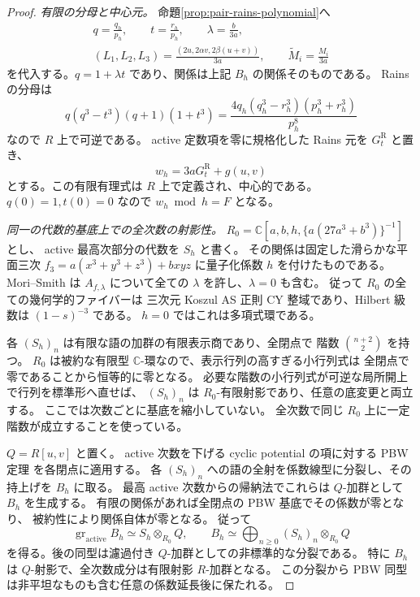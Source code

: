 \begin{proof}
\emph{有限の分母と中心元。}
命題\ref{prop:pair-rains-polynomial}へ
\[
 \begin{gathered}
 q=\frac{q_h}{p_h},\qquad t=\frac{r_h}{p_h},\qquad
 \lambda=\frac b{3a},\\
 (L_1,L_2,L_3)=\frac{(2u,2\alpha v,2\beta(u+v))}{3a},
 \qquad\widetilde M_i=\frac{M_i}{3a}
 \end{gathered}
\]
を代入する。$q=1+\lambda t$ であり、関係は上記 $B_h$ の関係そのものである。
Rains の分母は
\[
 q(q^3-t^3)(q+1)(1+t^3)
 =\frac{4q_h(q_h^3-r_h^3)(p_h^3+r_h^3)}{p_h^8}
\]
なので $R$ 上で可逆である。
active 定数項を零に規格化した Rains 元を $G_t^{\mathrm R}$ と置き、
\[
 w_h=3aG_t^{\mathrm R}+g(u,v)
\]
とする。この有限有理式は $R$ 上で定義され、中心的である。
$q(0)=1,t(0)=0$ なので $w_h\bmod h=F$ となる。

\emph{同一の代数的基底上での全次数の射影性。}
$R_0=\mathbb C[a,b,h,\{a(27a^3+b^3)\}^{-1}]$ とし、
active 最高次部分の代数を $S_h$ と書く。
その関係は固定した滑らかな平面三次
$f_3=a(x^3+y^3+z^3)+bxyz$ に量子化係数 $h$ を付けたものである。
Mori--Smith \cite[Theorem~4.2(1)]{MS} は
$A_{f,\lambda}$ について全ての $\lambda$ を許し、$\lambda=0$ も含む。
従って $R_0$ の全ての幾何学的ファイバーは
三次元 Koszul AS 正則 CY 整域であり、Hilbert 級数は $(1-s)^{-3}$ である。
$h=0$ ではこれは多項式環である。

各 $(S_h)_n$ は有限な語の加群の有限表示商であり、全閉点で
階数 $\binom{n+2}{2}$ を持つ。
$R_0$ は被約な有限型 $\mathbb C$-環なので、表示行列の高すぎる小行列式は
全閉点で零であることから恒等的に零となる。
必要な階数の小行列式が可逆な局所開上で行列を標準形へ直せば、
$(S_h)_n$ は $R_0$-有限射影であり、任意の底変更と両立する。
ここでは次数ごとに基底を縮小していない。
全次数で同じ $R_0$ 上に一定階数が成立することを使っている。

$Q=R[u,v]$ と置く。
active 次数を下げる cyclic potential の項に対する PBW 定理
\cite[Theorem~3.1]{BT}\cite[Proposition~7.3.1(ii)]{EG} を各閉点に適用する。
各 $(S_h)_n$ への語の全射を係数線型に分裂し、その持上げを $B_h$ に取る。
最高 active 次数からの帰納法でこれらは $Q$-加群として $B_h$ を生成する。
有限の関係があれば全閉点の PBW 基底でその係数が零となり、
被約性により関係自体が零となる。
従って
\[
 \operatorname{gr}_{\mathrm{active}}B_h\simeq S_h\otimes_{R_0}Q,
 \qquad B_h\simeq\bigoplus_{n\ge0}(S_h)_n\otimes_{R_0}Q
\]
を得る。後の同型は濾過付き $Q$-加群としての非標準的な分裂である。
特に $B_h$ は $Q$-射影で、全次数成分は有限射影 $R$-加群となる。
この分裂から PBW 同型は非平坦なものも含む任意の係数延長後に保たれる。


\end{proof}
